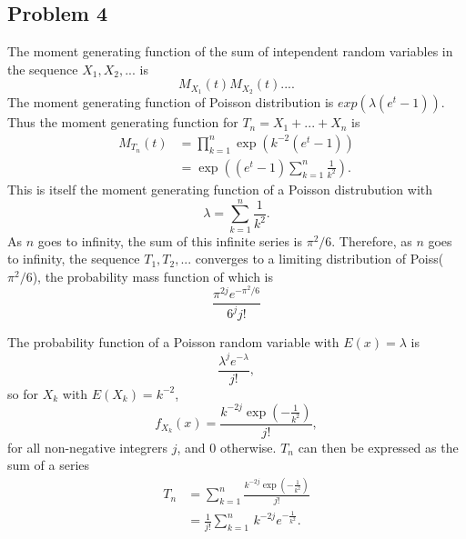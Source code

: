 \documentclass{article}
\begin{document}
\iffalse
We can now use Theorem 5.4.4 from the textbook to find an expression for the probability function of $\max\{X_1, ...\,, X_n\}$, the $n$-th order statistic of $X$:
\[\begin{aligned}
f_{X_{(n)}}(x) &= \frac{n!}{(n-1)!(n-n)!}f_X(x)\left[F_X(x)\right]^{n-1}\left[1-F_X(x)\right]^{n-n} \\
&= n\,f_X(x)\left[F_X(x)\right]^{n-1} \\
&= n\left(3(1-x)^2\right)\left[(x-1)^3 + 1\right]^{n-1}I_{(0,1)}(x)
\end{aligned}\]

On the domain $0<x<1$. We can find an expression for \[T_n = n^{1/3}\left(1-n\,f_X(x)\left[F_X(x)\right]^{n-1}.\right)\] While considering the limit with respect to $n$ of this function, it is important to note that $F_X \leq 1$ for all $x$ in the domain since it is a distribution function; therefore, $\left[F_X(x)\right]^{n-1}$ tends to zero as $n$ tends to infinity.
\fi

\subsection*{Problem 4}
The moment generating function of the sum of intependent random variables in the sequence $X_1, X_2, ...$ is 
\[M_{X_1}(t)M_{X_2}(t)... .\]
The moment generating function of Poisson distribution is $exp(\lambda(e^t-1))$. Thus the moment generating function for $T_n = X_1 + ... + X_n$ is
\[\begin{aligned}M_{T_n}(t) &= \prod_{k=1}^{n} \exp\left(k^{-2}\left(e^t - 1\right)\right) \\
&= \exp\left(\left(e^t-1\right)\sum_{k=1}^{n} \frac{1}{k^2}\right).\end{aligned}\] 
This is itself the moment generating function of a Poisson distrubution with \[\lambda = \sum_{k=1}^{n} \frac{1}{k^2}.\]
As $n$ goes to infinity, the sum of this infinite series is $\pi^2/6$. Therefore, as $n$ goes to infinity, the sequence $T_1, T_2, ...$ converges to a limiting distribution of Poiss($\pi^2/6$), the probability mass function of which is 
\[\frac{\pi^{2j} e^{-\pi^2/6}}{6^j j!}\]




\iffalse
The probability function of a Poisson random variable with $E(x) = \lambda$ is \[\frac{\lambda^je^{-\lambda}}{j!},\] so for $X_k$ with $E(X_k) = k^{-2}$, \[f_{X_k}(x) = \frac{k^{-2j}\exp\left(-\frac{1}{k^2}\right)}{j!},\] for all non-negative integrers $j$, and $0$ otherwise.
$T_n$ can then be expressed as the sum of a series 
\[\begin{aligned}
T_n &= \sum_{k=1}^{n}\frac{k^{-2j}\exp\left(-\frac{1}{k^2}\right)}{j!} \\
&=\frac{1}{j!}\sum_{k=1}^{n}\, k^{-2j}e^{-\frac{1}{k^2}}.\end{aligned}\]
\end{document}
